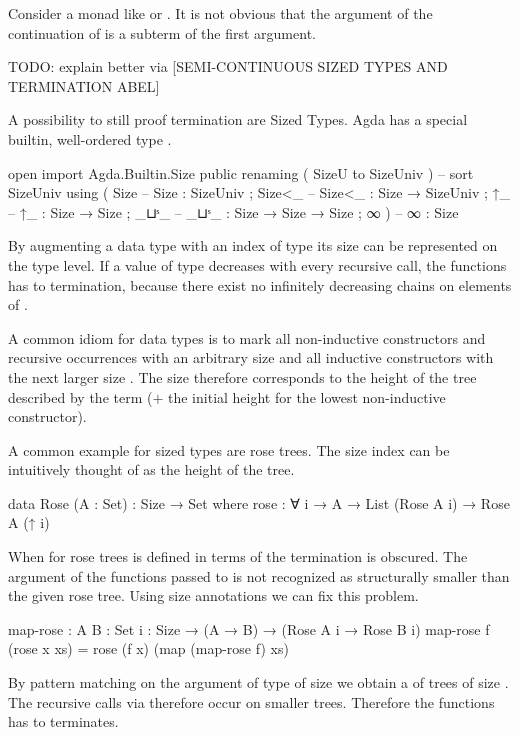 \documentclass[10pt,a4paper,twoside]{report}
\begin{document}
Consider a monad like  or .
It is not obvious that the argument of the continuation of \AgdaFunction{>>=} is
a subterm of the first argument.

TODO: explain better via [SEMI-CONTINUOUS SIZED TYPES AND TERMINATION ABEL]

A possibility to still proof termination are Sized Types.
Agda has a special builtin, well-ordered type .

\begin{code}
open import Agda.Builtin.Size public
  renaming ( SizeU to SizeUniv )  --  sort SizeUniv
  using    ( Size                 --  Size   : SizeUniv
           ; Size<_               --  Size<_ : Size → SizeUniv
           ; ↑_                   --  ↑_     : Size → Size
           ; _⊔ˢ_                 --  _⊔ˢ_   : Size → Size → Size
           ; ∞ )                  --  ∞      : Size
\end{code}
By augmenting a data type with an index of type  its
size can be represented on the type level.
If a value of type  decreases with every recursive call, the
functions has to termination, because there exist no infinitely decreasing
chains on elements of .

A common idiom for data types is to mark all non-inductive constructors and
recursive occurrences with an arbitrary size  and all inductive
constructors with the next larger size
\AgdaSpace{}.
The size therefore corresponds to the height of the tree described by the term
($+$ the initial height for the lowest non-inductive constructor).

A common example for sized types are rose trees.
The size index can be intuitively thought of as the height of the tree.

\begin{code}
data Rose (A : Set) : Size → Set where
  rose : ∀ {i} → A → List (Rose A i) → Rose A (↑ i)
\end{code}
When  for rose trees is defined in terms of
 the termination is obscured.
The argument of the functions passed to  is not recognized as
structurally smaller than the given rose tree.
Using size annotations we can fix this problem.

\begin{code}
map-rose : {A B : Set} {i : Size} → (A → B) → (Rose A i → Rose B i)
map-rose f (rose x xs) = rose (f x) (map (map-rose f) xs)
\end{code}
By pattern matching on the argument of type
\AgdaSpace{} of size
\AgdaSpace{} we obtain a  of
trees of size .
The recursive calls via  therefore occur on smaller trees.
Therefore the functions has to terminates.
\end{document}
